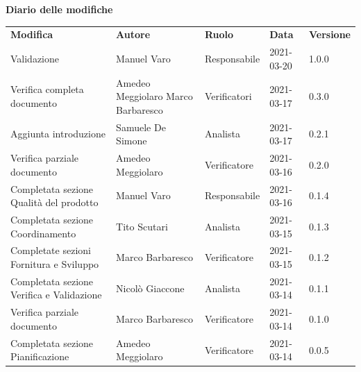 \documentclass[a4paper]{article}
\begin{document}
\begin{center}

    \textbf{\Large Diario delle modifiche}\\
    \vspace{10px}
    \begin{table}[h!]
        \centering
        \renewcommand{\arraystretch}{1.8}
        \begin{tabular}{p{160px} p{90px} p{65px} p{60px} p{45px}}
            \rowcolor{logo!70} \textbf{Modifica}        & \textbf{Autore}                             & \textbf{Ruolo} & \textbf{Data} & \textbf{Versione} \\
            Validazione                                 & Manuel Varo                                 & Responsabile   & 2021-03-20    & 1.0.0             \\
            Verifica completa documento                 & Amedeo Meggiolaro \newline Marco Barbaresco & Verificatori   & 2021-03-17    & 0.3.0             \\
            Aggiunta introduzione                       & Samuele De Simone                           & Analista       & 2021-03-17    & 0.2.1             \\
            Verifica parziale documento                 & Amedeo Meggiolaro                           & Verificatore   & 2021-03-16    & 0.2.0             \\
            Completata sezione Qualità del prodotto     & Manuel Varo                                 & Responsabile   & 2021-03-16    & 0.1.4             \\
            Completata sezione Coordinamento            & Tito Scutari                                & Analista       & 2021-03-15    & 0.1.3             \\
            Completate sezioni Fornitura e Sviluppo     & Marco Barbaresco                            & Verificatore   & 2021-03-15    & 0.1.2             \\
            Completata sezione Verifica e Validazione   & Nicolò Giaccone                             & Analista       & 2021-03-14    & 0.1.1             \\
            Verifica parziale documento                 & Marco Barbaresco                            & Verificatore   & 2021-03-14    & 0.1.0             \\
            Completata sezione Pianificazione           & Amedeo Meggiolaro                           & Verificatore   & 2021-03-14    & 0.0.5             \\

\end{tabular}
\end{table}
\end{center}
\end{document}
